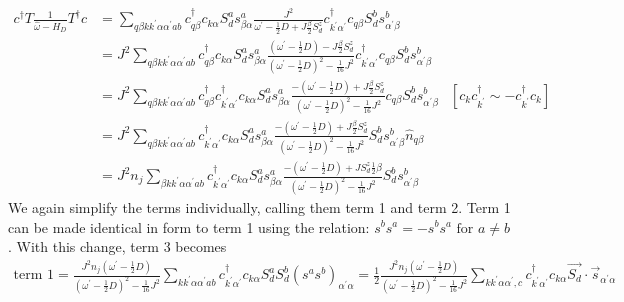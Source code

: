 \documentclass{revtex4-2}
\numberwithin{equation}{section}
\begin{document}
\begin{align}
	c^\dagger T \frac{1}{\hat \omega - H_D}T^\dagger c &= \sum_{q\beta k k^\prime \alpha \alpha^\prime a b} c^\dagger_{q\beta} c_{k\alpha} S_d^a s^a_{\beta \alpha} \frac{J^2}{\omega^\prime - \frac{1}{2}D + J \frac{\beta}{2}S_d^z }c^\dagger_{k^\prime\alpha^\prime} c_{q\beta} S_d^b s^b_{\alpha^\prime \beta} \\
							   &= J^2\sum_{q\beta k k^\prime \alpha \alpha^\prime a b} c^\dagger_{q\beta} c_{k\alpha} S_d^a s^a_{\beta \alpha} \frac{\left(\omega^\prime - \frac{1}{2}D\right) - J \frac{\beta}{2}S_d^z }{\left(\omega^\prime - \frac{1}{2}D\right)^2 - \frac{1}{16}J^2}c^\dagger_{k^\prime\alpha^\prime} c_{q\beta} S_d^b s^b_{\alpha^\prime \beta}\\
							   &= J^2\sum_{q\beta k k^\prime \alpha \alpha^\prime a b} c^\dagger_{q\beta} c^\dagger_{k^\prime\alpha^\prime}c_{k\alpha} S_d^a s^a_{\beta \alpha} \frac{-\left(\omega^\prime - \frac{1}{2}D\right) + J \frac{\beta}{2}S_d^z}{\left(\omega^\prime - \frac{1}{2}D\right)^2 - \frac{1}{16}J^2} c_{q\beta} S_d^b s^b_{\alpha^\prime \beta} & \left[c_k c^\dagger_{k^\prime} \sim - c^\dagger_{k^\prime}c_k\right] \\
							   &= J^2\sum_{q\beta k k^\prime \alpha \alpha^\prime a b} c^\dagger_{k^\prime\alpha^\prime}c_{k\alpha} S_d^a s^a_{\beta \alpha} \frac{-\left(\omega^\prime - \frac{1}{2}D\right) + J \frac{\beta}{2}S_d^z}{\left(\omega^\prime - \frac{1}{2}D\right)^2 - \frac{1}{16}J^2} S_d^b s^b_{\alpha^\prime \beta} \hat n_{q\beta} \\
							   &= J^2 n_j \sum_{\beta k k^\prime \alpha \alpha^\prime a b} c^\dagger_{k^\prime\alpha^\prime}c_{k\alpha} S_d^a s^a_{\beta \alpha} \frac{-\left(\omega^\prime - \frac{1}{2}D\right) + J S_d^z \frac{1}{2}\beta}{\left(\omega^\prime - \frac{1}{2}D\right)^2 - \frac{1}{16}J^2} S_d^b s^b_{\alpha^\prime \beta}
\end{align}
We again simplify the terms individually, calling them term 1 and term 2. Term 1 can be made identical in form to term 1 using the relation: \(s^b s^a = -s^b s^a \text{ for } a \neq b\). With this change, term 3 becomes
\begin{equation}\begin{aligned}
	\label{term3}
	\text{term 1} = \frac{J^2 n_j \left(\omega^\prime - \frac{1}{2}D\right)}{\left(\omega^\prime - \frac{1}{2}D\right)^2 - \frac{1}{16}J^2}\sum_{k k^\prime \alpha \alpha^\prime a b} c^\dagger_{k^\prime\alpha^\prime}c_{k\alpha} S_d^a  S_d^b \left(s^a s^b\right)_{\alpha^\prime \alpha} = \frac{1}{2}\frac{J^2 n_j \left(\omega^\prime - \frac{1}{2}D\right)}{\left(\omega^\prime - \frac{1}{2}D\right)^2 - \frac{1}{16}J^2} \sum_{k k^\prime \alpha \alpha^\prime,c} c^\dagger_{k^\prime\alpha^\prime} c_{k\alpha} \vec{S_d}\cdot\vec{s}_{\alpha^\prime \alpha}
\end{aligned}\end{equation}
\end{document}
